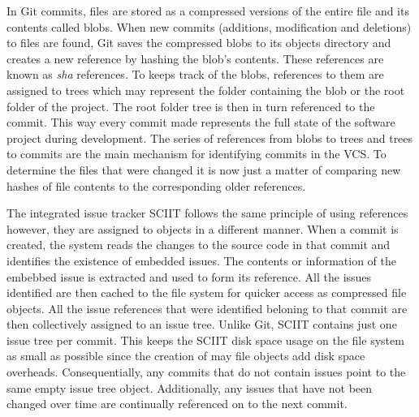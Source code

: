 \documentclass{mproj}
\begin{document}

In Git commits, files are stored as a compressed versions of the entire file and its contents called blobs. When new commits (additions, modification and deletions) to files are found, Git saves the compressed blobs to its objects directory and creates a new reference by hashing the blob's contents. These references are known as \textit{sha} references. To keeps track of the blobs, references to them are assigned to trees which may represent the folder containing the blob or the root folder of the project.  The root folder tree is then in turn referenced to the commit. This way every commit made represents the full state of the software project during development. The series of references from blobs to trees and trees to commits are the main mechanism for identifying commits in the VCS. To determine the files that were changed it is now just a matter of comparing new hashes of file contents to the corresponding older references.


The integrated issue tracker SCIIT follows the same principle of using references however, they are assigned to objects in a different manner. When a commit is created, the system reads the changes to the source code in that commit and identifies the existence of embedded issues. The contents or information of the embebbed issue is extracted and used to form its reference. All the issues identified are then cached to the file system for quicker access as compressed file objects. All the issue references that were identified beloning to that commit are then collectively assigned to an issue tree. Unlike Git, SCIIT contains just one issue tree per commit. This keeps the SCIIT disk space usage on the file system as small as possible since the creation of may file objects add disk space overheads. Consequentially, any commits that do not contain issues point to the same empty issue tree object. Additionally, any issues that have not been changed over time are continually referenced on to the next commit.
\end{document}
